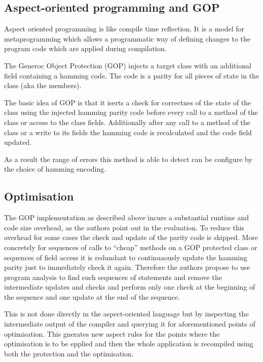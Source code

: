 \documentclass[paper=a4, fontsize=11pt]{scrartcl} %
\numberwithin{equation}{section} %
\numberwithin{figure}{section} %
\numberwithin{table}{section} %
\begin{document}
\subsection{Aspect-oriented programming and GOP}

Aspect oriented programming is like compile time reflection.
It is a model for metaprogramming which allows a programmatic way of defining changes to the program code which are applied during compilation.

The Generoc Object Protection (GOP) injects a target class with an additional field containing a hamming code.
The code is a parity for all pieces of state in the class (aka the members).

The basic idea of GOP is that it iserts a check for correctnes of the state of the class using the injected hamming parity code before every call to a method of the class or access to the class fields.
Additionally after any call to a method of the class or a write to its fields the hamming code is recalculated and the code field updated.

As a result the range of errors this method is able to detect can be configure by the choice of hamming encoding.

\subsection{Optimisation}

The GOP implementation as described above incurs a substantial runtime and code size overhead, as the authors point out in the evaluation.
To reduce this overhead for some cases the check and update of the parity code is skipped.
More concretely for sequences of calls to ``cheap'' methods on a GOP protected class or sequences of field access it is redundant to continuaously update the hamming parity just to immediately check it again.
Therefore the authors propose to use program analysis to find such sequences of statements and remove the intermediate updates and checks and perform only one check at the beginning of the sequence and one update at the end of the sequence.

This is not done directly in the aspect-oriented language but by inspecting the intermediate output of the compiler and querying it for aforementioned points of optimisation.
This gnerates new aspect rules for the points where the optimisation is to be epplied and then the whole application is recompiled using both the protection and the optimisation.
\end{document}
